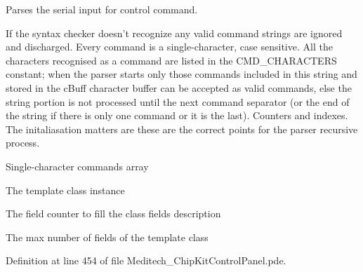Parses the serial input for control command. 

If the syntax checker doesn't recognize any valid command strings are ignored and discharged. Every command is a single-\/character, case sensitive. All the characters recognised as a command are listed in the C\-M\-D\-\_\-\-C\-H\-A\-R\-A\-C\-T\-E\-R\-S constant; when the parser starts only those commands included in this string and stored in the c\-Buff character buffer can be accepted as valid commands, else the string portion is not processed until the next command separator (or the end of the string if there is only one command or it is the last). Counters and indexes. The initaliasation matters are these are the correct points for the parser recursive process.

Single-\/character commands array

The template class instance

The field counter to fill the class fields description

The max number of fields of the template class 

Definition at line 454 of file Meditech\-\_\-\-Chip\-Kit\-Control\-Panel.\-pde.



